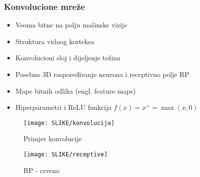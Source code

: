 \documentclass{beamer}
\begin{document}
\begin{frame}
\frametitle{Konvolucione mreže}
  
\begin{itemize}
\item Veoma bitne na polju mašinske vizije
\item Struktura vidnog korteksa
\item Konvolucioni sloj i dijeljenje težina
\item Posebno 3D raspoređivanje neurona i receptivno polje RP
\item Mape bitnih odlika (engl. feature maps)
\item Hiperparametri i ReLU funkcija $f(x)=x^{+}=\max(x,0)$
\end{itemize}


\begin{figure}[ht]
        \begin{minipage}[b]{0.5\linewidth}
            \centering
            \texttt{[image: SLIKE/konvolucija]}
            \caption{Primjer konvolucije}
            \label{fig:a}
        \end{minipage}
        \hspace{0.5cm}
        \begin{minipage}[b]{0.4\linewidth}
            \centering
            \texttt{[image: SLIKE/receptive]}
            \caption{RP - crveno}
            \label{fig:b}
        \end{minipage}
    \end{figure}

\end{frame}
\end{document}

